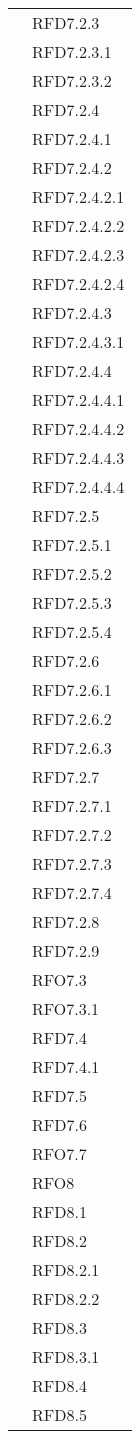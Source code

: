 \begin{longtable}{|>{\centering}m{10cm}|m{3cm}<{\centering}|}
& RFD7.2.3\\
& RFD7.2.3.1\\
& RFD7.2.3.2\\
& RFD7.2.4\\
& RFD7.2.4.1\\
& RFD7.2.4.2\\
& RFD7.2.4.2.1\\
& RFD7.2.4.2.2\\
& RFD7.2.4.2.3\\
& RFD7.2.4.2.4\\
& RFD7.2.4.3\\
& RFD7.2.4.3.1\\
& RFD7.2.4.4\\
& RFD7.2.4.4.1\\
& RFD7.2.4.4.2\\
& RFD7.2.4.4.3\\
& RFD7.2.4.4.4\\
& RFD7.2.5\\
& RFD7.2.5.1\\
& RFD7.2.5.2\\
& RFD7.2.5.3\\
& RFD7.2.5.4\\
& RFD7.2.6\\
& RFD7.2.6.1\\
& RFD7.2.6.2\\
& RFD7.2.6.3\\
& RFD7.2.7\\
& RFD7.2.7.1\\
& RFD7.2.7.2\\
& RFD7.2.7.3\\
& RFD7.2.7.4\\
& RFD7.2.8\\
& RFD7.2.9\\
& RFO7.3\\
& RFO7.3.1\\
& RFD7.4\\
& RFD7.4.1\\
& RFD7.5\\
& RFD7.6\\
& RFO7.7\\
& RFO8\\
& RFD8.1\\
& RFD8.2\\
& RFD8.2.1\\
& RFD8.2.2\\
& RFD8.3\\
& RFD8.3.1\\
& RFD8.4\\
& RFD8.5\\

\end{longtable}
